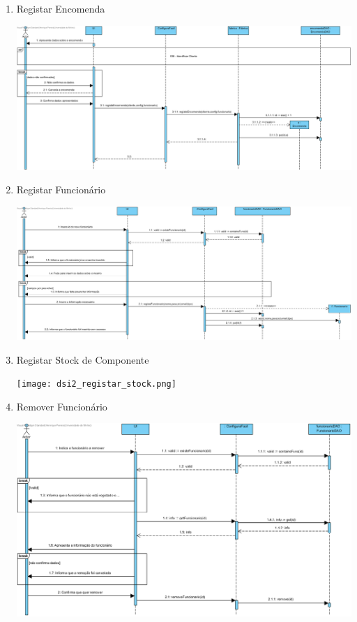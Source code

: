 \documentclass[11pt]{article} %
\begin{document}
\begin{enumerate}
\begin{center}
		\end{center}
	\item Registar Encomenda
		\begin{center}
 			\includegraphics[width = 6in]{dsi2_registar_encomenda.png}
		\end{center}
	\item Registar Funcionário
		\begin{center}
 			\includegraphics[width = 6in]{dsi2_registar_funcionario.png}
		\end{center}
	\item Registar Stock de Componente
		\begin{center}
 			\texttt{[image: dsi2\_registar\_stock.png]}
		\end{center}
	\item Remover Funcionário
		\begin{center}
 			\includegraphics[width = 6in]{dsi2_remover_funcionario.png}
		\end{center}
\end{enumerate}
\end{document}
